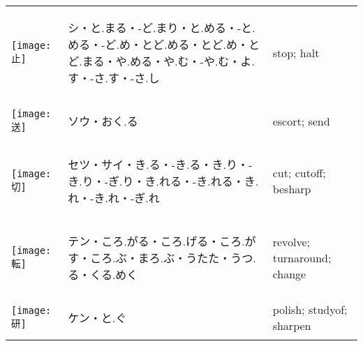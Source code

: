 \documentclass[a4paper,12pt]{extarticle}
\begin{document}
\begin{longtable}{|lp{6cm}p{4cm}|}
\begin{minipage}{0.3\textwidth}
\centerline{
	\texttt{[image: 止]}
}
\end{minipage}
&
\begin{CJK}{UTF8}{min}シ・と.まる・-ど.まり・と.める・-と.める・-ど.め・とど.める・とど.め・とど.まる・や.める・や.む・-や.む・よ.す・-さ.す・-さ.し\end{CJK}
&
stop; halt
\\ 
\begin{minipage}{0.3\textwidth}
\centerline{
	\texttt{[image: 送]}
}
\end{minipage}
&
\begin{CJK}{UTF8}{min}ソウ・おく.る\end{CJK}
&
escort; send
\\ 
\begin{minipage}{0.3\textwidth}
\centerline{
	\texttt{[image: 切]}
}
\end{minipage}
&
\begin{CJK}{UTF8}{min}セツ・サイ・き.る・-き.る・き.り・-き.り・-ぎ.り・き.れる・-き.れる・き.れ・-き.れ・-ぎ.れ\end{CJK}
&
cut; cutoff; besharp
\\ 
\begin{minipage}{0.3\textwidth}
\centerline{
	\texttt{[image: 転]}
}
\end{minipage}
&
\begin{CJK}{UTF8}{min}テン・ころ.がる・ころ.げる・ころ.がす・ころ.ぶ・まろ.ぶ・うたた・うつ.る・くる.めく\end{CJK}
&
revolve; turnaround; change
\\ 
\begin{minipage}{0.3\textwidth}
\centerline{
	\texttt{[image: 研]}
}
\end{minipage}
&
\begin{CJK}{UTF8}{min}ケン・と.ぐ\end{CJK}
&
polish; studyof; sharpen

\end{longtable}
\end{document}
